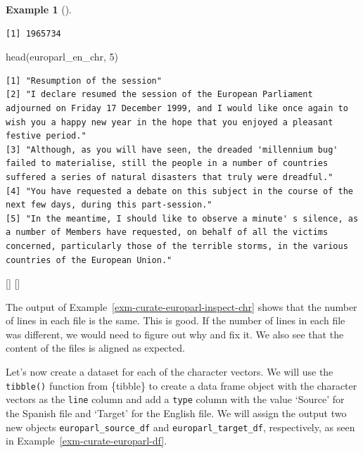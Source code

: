 \documentclass[
  letterpaper,
  krantz1]{latex/krantz-mod}
\newenvironment{Shaded}{\begin{snugshade}}{\end{snugshade}}
\newcommand{\DecValTok}[1]{\textcolor[rgb]{0.00,0.00,0.00}{#1}}
\newcommand{\FunctionTok}[1]{\textcolor[rgb]{0.00,0.00,0.00}{#1}}
\newcommand{\NormalTok}[1]{\textcolor[rgb]{0.00,0.00,0.00}{#1}}
\newcommand{\cindex}[1]{%
  \StrSubstitute{#1}{_}{\_}[\temp]%
  \index{\temp}%
}
\theoremstyle{definition}
\theoremstyle{definition}
\newtheorem{example}{Example}[chapter]
\theoremstyle{remark}
\begin{document}
\begin{example}[]
\begin{verbatim}
[1] 1965734
\end{verbatim}

\begin{Shaded}
\begin{Highlighting}[numbers=left,,]
\FunctionTok{head}\NormalTok{(europarl\_en\_chr, }\DecValTok{5}\NormalTok{)}
\end{Highlighting}
\end{Shaded}

\begin{verbatim}
[1] "Resumption of the session"                                                                                                                                                                                                               
[2] "I declare resumed the session of the European Parliament adjourned on Friday 17 December 1999, and I would like once again to wish you a happy new year in the hope that you enjoyed a pleasant festive period."                         
[3] "Although, as you will have seen, the dreaded 'millennium bug' failed to materialise, still the people in a number of countries suffered a series of natural disasters that truly were dreadful."                                         
[4] "You have requested a debate on this subject in the course of the next few days, during this part-session."                                                                                                                               
[5] "In the meantime, I should like to observe a minute' s silence, as a number of Members have requested, on behalf of all the victims concerned, particularly those of the terrible storms, in the various countries of the European Union."
\end{verbatim}

\cindex{length()}\cindex{head()}

\end{example}

The output of Example~\ref{exm-curate-europarl-inspect-chr} shows that
the number of lines in each file is the same. This is good. If the
number of lines in each file was different, we would need to figure out
why and fix it. We also see that the content of the files is aligned as
expected.

Let's now create a dataset for each of the character vectors. We will
use the \texttt{tibble()} function from \{tibble\} to create a data
frame object with the character vectors as the \texttt{line} column and
add a \texttt{type} column with the value `Source' for the Spanish file
and `Target' for the English file. We will assign the output two new
objects \texttt{europarl\_source\_df} and \texttt{europarl\_target\_df},
respectively, as seen in Example~\ref{exm-curate-europarl-df}.
\end{document}
